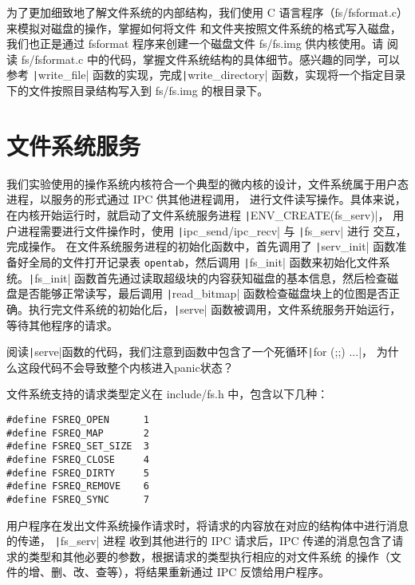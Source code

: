 为了更加细致地了解文件系统的内部结构，我们使用 C 语言程序（fs/fsformat.c）来模拟对磁盘的操作，掌握如何将文件
和文件夹按照文件系统的格式写入磁盘，我们也正是通过 fsformat 程序来创建一个磁盘文件 fs/fs.img 供内核使用。请
阅读 fs/fsformat.c 中的代码，掌握文件系统结构的具体细节。感兴趣的同学，可以参考 \texttt|write_file|
函数的实现，完成\texttt|write_directory| 函数，实现将一个指定目录下的文件按照目录结构写入到
fs/fs.img 的根目录下。

\section{文件系统服务}

我们实验使用的操作系统内核符合一个典型的微内核的设计，文件系统属于用户态进程，以服务的形式通过 IPC 供其他进程调用，
进行文件读写操作。具体来说，在内核开始运行时，就启动了文件系统服务进程 \texttt|ENV_CREATE(fs_serv)|，
用户进程需要进行文件操作时，使用 \texttt|ipc_send/ipc_recv| 与 \texttt|fs_serv| 进行
交互，完成操作。
在文件系统服务进程的初始化函数中，首先调用了 \texttt|serv_init| 函数准备好全局的文件打开记录表
\texttt{opentab}，然后调用 \texttt|fs_init| 函数来初始化文件系统。\texttt|fs_init|
函数首先通过读取超级块的内容获知磁盘的基本信息，然后检查磁盘是否能够正常读写，最后调用 \texttt|read_bitmap|
函数检查磁盘块上的位图是否正确。执行完文件系统的初始化后，\texttt|serve| 函数被调用，文件系统服务开始运行，
等待其他程序的请求。

\begin{thinking}\label{think-fs-serve}
阅读\texttt|serve|函数的代码，我们注意到函数中包含了一个死循环\texttt|for (;;) {...}|，
为什么这段代码不会导致整个内核进入panic状态？
\end{thinking}

文件系统支持的请求类型定义在 include/fs.h 中，包含以下几种：

\begin{verbatim}
#define FSREQ_OPEN      1
#define FSREQ_MAP       2
#define FSREQ_SET_SIZE  3
#define FSREQ_CLOSE     4
#define FSREQ_DIRTY     5
#define FSREQ_REMOVE    6
#define FSREQ_SYNC      7
\end{verbatim}

用户程序在发出文件系统操作请求时，将请求的内容放在对应的结构体中进行消息的传递， \texttt|fs_serv| 进程
收到其他进行的 IPC 请求后，IPC 传递的消息包含了请求的类型和其他必要的参数，根据请求的类型执行相应的对文件系统
的操作（文件的增、删、改、查等），将结果重新通过 IPC 反馈给用户程序。

